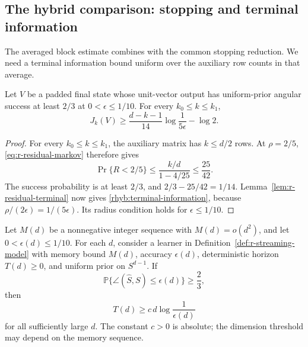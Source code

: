 \subsection{The hybrid comparison: stopping and terminal information}
\label{subsec:r-hybrid-application}

The averaged block estimate combines with the common stopping
reduction.  We need a terminal information bound uniform over the
auxiliary row counts in that average.

\begin{lemma}
\label{rhyb:terminal}
Let \(V\) be a padded final state whose unit-vector output has
uniform-prior angular success at least \(2/3\) at
\(0<\epsilon\le1/10\).  For every \(k_0\le k\le k_1\),
\begin{equation}\label{rhyb:terminal-information}
 J_k(V)\ge\frac{d-k-1}{14}\log\frac1{5\epsilon}-\log2.
\end{equation}
\end{lemma}

\begin{proof}
For every \(k_0\le k\le k_1\), the auxiliary matrix has
\(k\le d/2\) rows.  At \(\rho=2/5\),
\eqref{eq:r-residual-markov} therefore gives
\[
 \Pr\{R<2/5\}\le\frac{k/d}{1-4/25}\le\frac{25}{42}.
\]
The success probability is at least \(2/3\), and
\(2/3-25/42=1/14\).  Lemma~\ref{lem:r-residual-terminal}
now gives \eqref{rhyb:terminal-information}, because
\(\rho/(2\epsilon)=1/(5\epsilon)\).  Its radius condition
holds for \(\epsilon\le1/10\).
\end{proof}

\begin{theorem}
\label{rhyb:conclusion}
Let \(M(d)\) be a nonnegative integer sequence with \(M(d)=o(d^2)\), and
let \(0<\epsilon(d)\le1/10\).  For each \(d\), consider a learner in
Definition~\ref{def:r-streaming-model} with memory bound \(M(d)\),
accuracy \(\epsilon(d)\), deterministic horizon \(T(d)\ge0\), and
uniform prior on \(S^{d-1}\).  If
\[
 \mathbb P\{\angle(\widehat S,S)\le\epsilon(d)\}\ge\frac23,
\]
then
\[
 T(d)\ge c\,d\log\frac1{\epsilon(d)}
\]
for all sufficiently large \(d\).  The constant \(c>0\) is absolute;
the dimension threshold may depend on the memory sequence.
\end{theorem}

